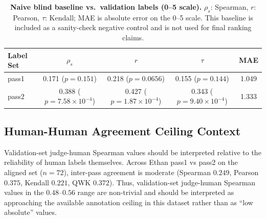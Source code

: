 \documentclass{article}
\begin{document}
\begin{table}[t]
  \centering
  \small
  \begin{tabular}{lcccc}
    \toprule
    \textbf{Label Set} & \(\rho_s\)                      & \(r\)                           & \(\tau\)                        & \textbf{MAE} \\
    \midrule
    pass1              & 0.171 (\(p=0.151\))             & 0.218 (\(p=0.0656\))            & 0.155 (\(p=0.144\))             & 1.049        \\
    pass2              & 0.388 (\(p=7.58\times10^{-4}\)) & 0.427 (\(p=1.87\times10^{-4}\)) & 0.343 (\(p=9.40\times10^{-4}\)) & 1.333        \\
    \bottomrule
  \end{tabular}
  \caption{\textbf{Naive blind baseline vs.\ validation labels (0--5 scale).}
    \(\rho_s\): Spearman, \(r\): Pearson, \(\tau\): Kendall; MAE is absolute error on the 0--5 scale.
    This baseline is included as a sanity-check negative control and is not used for final ranking claims.}
  \label{tab:app-naive-blind-baseline}
\end{table}

\subsection{Human-Human Agreement Ceiling Context}
Validation-set judge-human Spearman values should be interpreted relative to the reliability of human labels themselves.
Across Ethan pass1 vs pass2 on the aligned set (\(n=72\)), inter-pass agreement is moderate (Spearman \(0.249\), Pearson \(0.375\), Kendall \(0.221\), QWK \(0.372\)).
Thus, validation-set judge-human Spearman values in the \(0.48\)--\(0.56\) range are non-trivial and should be interpreted as approaching the available annotation ceiling in this dataset rather than as ``low absolute'' values.
\end{document}
